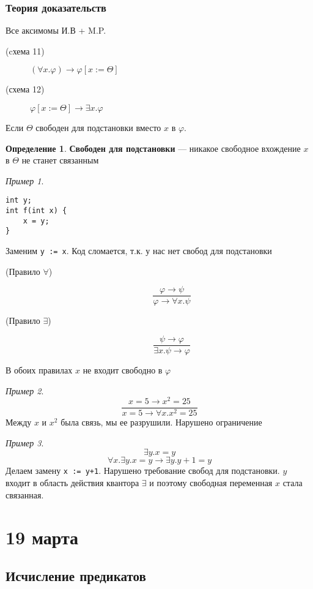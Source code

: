 \documentclass[oneside]{book}
\theoremstyle{plain}
\theoremstyle{remark}
\newtheorem*{examp}{Пример}
\theoremstyle{definition}
\newtheorem*{definition}{Определение}
\begin{document}
\subsection{Теория доказательств}
\label{sec:org3be4112}
Все аксимомы И.В + M.P.
\begin{description}
\item[{(cхема 11)}] \((\forall x. \varphi) \to \varphi[x:=\Theta]\)
\item[{(схема 12)}] \(\varphi[x:=\Theta]\to \exists x. \varphi\)
\end{description}
Если \(\Theta\) свободен для подстановки вместо \(x\) в \(\varphi\).
\begin{definition}
\textbf{Свободен для подстановки} --- никакое свободное вхождение \(x\) в \(\Theta\) не станет связанным
\end{definition}
\begin{examp}
\-
\begin{verbatim}
int y;
int f(int x) {
	x = y;
}
\end{verbatim}
Заменим \texttt{y := x}. Код сломается, т.к. у нас нет свобод для подстановки
\end{examp}
\begin{description}
\item[{(Правило \(\forall\))}] \[\frac{\varphi \to \psi}{\varphi \to \forall x. \psi}\]
\item[{(Правило \(\exists\))}] \[ \frac{\psi \to \varphi}{\exists x.\psi \to \varphi} \]
\end{description}
В обоих правилах \(x\) не входит свободно в \(\varphi\)
\begin{examp}
\[ \frac{x = 5 \to x^2 = 25}{x = 5 \to \forall x. x^2 = 25} \]
Между \(x\) и \(x^2\) была связь, мы ее разрушили. Нарушено ограничение
\end{examp}
\begin{examp}
\[ \exists y. x = y \]
\[ \forall x. \exists y. x = y \to \exists y. y + 1 = y \]
Делаем замену \texttt{x := y+1}. Нарушено требование свобод для подстановки. \(y\) входит в область действия квантора \(\exists\) и поэтому свободная переменная \(x\) стала связанная.
\end{examp}
\chapter{19 марта}
\label{sec:orgd20d59c}
\section{Исчисление предикатов}
\label{sec:orgc259473}
\end{document}

